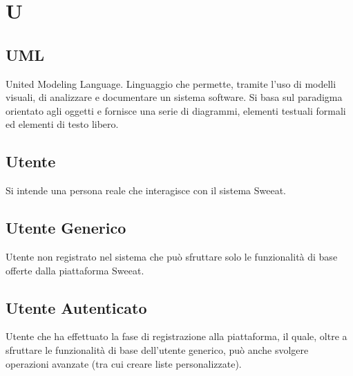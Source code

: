 \section{U}

\subsection{UML} United Modeling Language. Linguaggio che permette, tramite l'uso di modelli visuali, di analizzare e documentare un sistema software. Si basa sul paradigma orientato agli oggetti e fornisce una serie di diagrammi, elementi testuali formali ed elementi di testo libero.
\subsection{Utente} Si intende una persona reale che interagisce con il sistema Sweeat.

\subsection{Utente Generico} Utente non registrato nel sistema che può sfruttare solo le funzionalità di base offerte dalla piattaforma Sweeat.

\subsection{Utente Autenticato} Utente che ha effettuato la fase di registrazione alla piattaforma, il quale, oltre a sfruttare le funzionalità di base dell’utente generico, può anche svolgere operazioni avanzate (tra cui creare liste personalizzate).

\clearpage